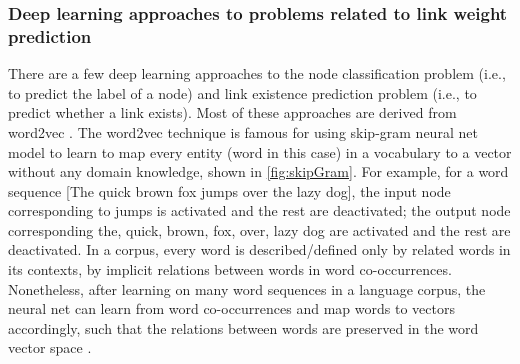 \documentclass{article}
\begin{document}
\subsubsection{Deep learning approaches to problems related to link weight prediction}
There are a few deep learning approaches to
the node classification problem (i.e., to predict the label of a node) and 
link existence prediction problem (i.e., to predict whether a link exists).
Most of these approaches are derived from word2vec \cite{mikolov2013efficient}.
The word2vec technique is famous for using skip-gram neural net model
to learn to map every entity (word in this case) in a vocabulary to a vector
without any domain knowledge, shown in \autoref{fig:skipGram}.
For example, for a word sequence [The quick brown fox jumps over the lazy dog],
the input node corresponding to jumps is activated and the rest are deactivated;
the output node corresponding the, quick, brown, fox, over, lazy dog are activated
and the rest are deactivated.
In a corpus, every word is described/defined only by related words in its 
contexts, by implicit relations between words in word co-occurrences.
Nonetheless, after learning on many word sequences in a language corpus,
the neural net can learn from word co-occurrences and map words to 
vectors accordingly,
such that the relations between words are preserved in the word vector space 
\cite{mikolov2013distributed}.
\end{document}
